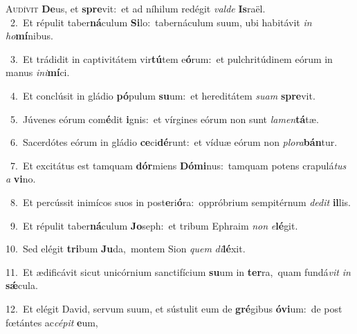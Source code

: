 \lettrine{\initial\textcolor{\initialcolor}{A}}{udívit} \textbf{De}\-us, et \textbf{spre}\-vit:~\star et ad níhilum redégit \textit{val}\-\textit{de} \textbf{Is}\-raël.\\
{\numbfont\textcolor{\numbcolor}{~2.}}~Et répulit taber\-\textbf{ná}\-culum \textbf{Si}\-lo:~\star tabernáculum suum, ubi habitávit \textit{in} \textit{ho}\-\textbf{mí}nibus.\par
{\numbfont\textcolor{\numbcolor}{~3.}}~Et trádidit in captivitátem vir\-\textbf{tú}\-tem e\-\textbf{ó}\-rum:~\star et pulchritúdinem eórum in manus \textit{in}\-\textit{i}\textbf{mí}ci.\par
{\numbfont\textcolor{\numbcolor}{~4.}}~Et conclúsit in gládio \textbf{pó}\-pulum \textbf{su}\-um:~\star et hereditátem \textit{su}\-\textit{am} \textbf{spre}\-vit.\par
{\numbfont\textcolor{\numbcolor}{~5.}}~Júvenes eórum com\-\textbf{é}\-dit \textbf{i}\-gnis:~\star et vírgines eórum non sunt \textit{la}\-\textit{men}\textbf{tá}tæ.\par
{\numbfont\textcolor{\numbcolor}{~6.}}~Sacerdótes eórum in gládio \textbf{ce}\-ci\-\textbf{dé}\-runt:~\star et víduæ eórum non \textit{plo}\-\textit{ra}\textbf{bán}tur.\par
{\numbfont\textcolor{\numbcolor}{~7.}}~Et excitátus est tamquam \textbf{dór}\-miens \textbf{Dó}\-\textbf{mi}nus:~\star tamquam potens crapulá\textit{tus} \textit{a} \textbf{vi}\-no.\par
{\numbfont\textcolor{\numbcolor}{~8.}}~Et percússit inimícos suos in post\-\textbf{e}\-ri\-\textbf{ó}\-ra:~\star oppróbrium sempitérnum \textit{de}\-\textit{dit} \textbf{il}\-lis.\par
{\numbfont\textcolor{\numbcolor}{~9.}}~Et répulit taber\-\textbf{ná}\-culum \textbf{Jo}\-seph:~\star et tribum Ephraim \textit{non} \textit{e}\-\textbf{lé}git.\par
{\numbfont\textcolor{\numbcolor}{10.}}~Sed elégit \textbf{tri}\-bum \textbf{Ju}\-da,~\star montem Sion \textit{quem} \textit{di}\-\textbf{lé}xit.\par
{\numbfont\textcolor{\numbcolor}{11.}}~Et ædificávit sicut unicórnium sanctifícium \textbf{su}\-um in \textbf{ter}\-ra,~\star quam fundá\textit{vit} \textit{in} \textbf{sǽ}\-cula.\par
{\numbfont\textcolor{\numbcolor}{12.}}~Et elégit David, servum suum, et sústulit eum de \textbf{gré}\-gibus \textbf{ó}\-\textbf{vi}um:~\star de post fœtántes ac\-\textit{cé}\-\textit{pit} \textbf{e}\-um,\par
